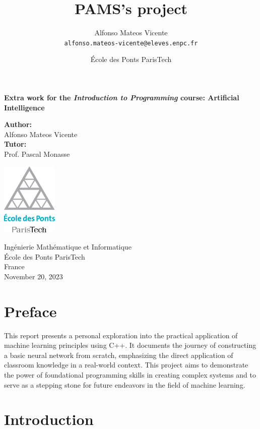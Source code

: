 \documentclass{article}
\title{PAMS's project} %
\author{Alfonso Mateos Vicente\\ \texttt{alfonso.mateos-vicente@eleves.enpc.fr}} %
\date{École des Ponts ParisTech} %
\begin{document}
\begin{titlepage}
    \begin{center}
        \vspace*{1cm}
        
        \Huge
        \textbf{Extra work for the \textit{Introduction to Programming} course: Artificial Intelligence}
        
        \vspace{1.5cm}

        \Large
        \textbf{Author:} \\
        \vspace{0.25cm}
        \LARGE
        Alfonso Mateos Vicente \\
        \vspace{0.5cm}
        \Large
        \textbf{Tutor:} \\
        \vspace{0.25cm}
        \LARGE
        Prof. Pascal Monasse

        \vfill
        
        \includegraphics[width=0.2\textwidth]{./logo-enpc.eps}
        
        \vspace{1cm}
        
        \normalsize
        Ingénierie Mathématique et Informatique \\
        École des Ponts ParisTech \\
        France \\
        November 20, 2023
    \end{center}
    \restoregeometry
\end{titlepage}


\newpage
\tableofcontents
\newpage


\section*{Preface}

This report presents a personal exploration into the practical application of machine learning principles using C++. It documents the journey of constructing a basic neural network from scratch, emphasizing the direct application of classroom knowledge in a real-world context. This project aims to demonstrate the power of foundational programming skills in creating complex systems and to serve as a stepping stone for future endeavors in the field of machine learning.

\section{Introduction}








\newpage


\end{document}
